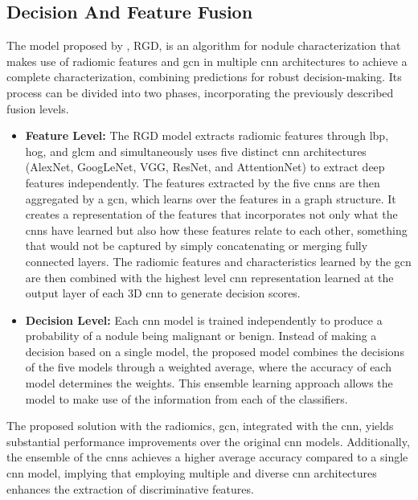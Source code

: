 \subsection{Decision And Feature Fusion}

The model proposed by \textcite{ma_novel_2023}, RGD, is an algorithm for nodule characterization that makes use of radiomic features and \ac{gcn} in multiple \ac{cnn} architectures to achieve a complete characterization, combining predictions for robust decision-making.
Its process can be divided into two phases, incorporating the previously described fusion levels.
\begin{itemize}
    \item \textbf{Feature Level:} The RGD model extracts radiomic features through \ac{lbp}, \ac{hog}, and \ac{glcm} and simultaneously uses five distinct \ac{cnn} architectures (AlexNet, GoogLeNet, VGG, ResNet, and AttentionNet) to extract deep features independently.
        The features extracted by the five \acp{cnn} are then aggregated by a  \ac{gcn}, which learns over the features in a graph structure. It creates a representation of the features that incorporates not only what the \acp{cnn} have learned but also how these features relate to each other, something that would not be captured by simply concatenating or merging fully connected layers.
    The radiomic features and characteristics learned by the \ac{gcn} are then combined with the highest level \ac{cnn} representation learned at the output layer of each 3D \ac{cnn} to generate decision scores. 
    
    \item \textbf{Decision Level:} Each \ac{cnn} model is trained independently to produce a probability of a nodule being malignant or benign.
    Instead of making a decision based on a single model, the proposed model combines the decisions of the five models through a weighted average, where the accuracy of each model determines the weights. This ensemble learning approach allows the model to make use of the information from each of the classifiers.
\end{itemize}

    The proposed solution with the radiomics, \ac{gcn}, integrated with the \ac{cnn}, yields substantial performance improvements over the original \ac{cnn} models. Additionally, the ensemble of the \acp{cnn} achieves a higher average accuracy compared to a single \ac{cnn} model, implying that employing multiple and diverse \ac{cnn} architectures enhances the extraction of discriminative features.

